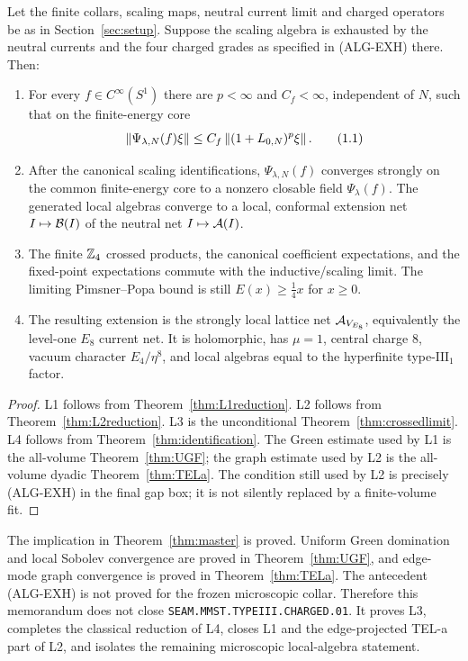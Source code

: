 \begin{theorem}
\label{thm:master}
Let the finite collars, scaling maps, neutral current limit and charged
operators be as in Section~\ref{sec:setup}.  Suppose the scaling algebra
is exhausted by the neutral currents and
the four charged grades as specified in \textup{(ALG-EXH)} there.  Then:
\begin{enumerate}[label=\textup{(L\arabic*)}]
\item For every $f\in C^\infty(S^1)$ there are $p<\infty$ and
  $C_f<\infty$, independent of $N$, such that on the finite-energy core
  \[
    \left\lVert\Psi_{\lambda,N}(f)\xi\right\rVert
    \le C_f\left\lVert(1+L_{0,N})^p\xi\right\rVert.
  \tag{1.1}\label{eq:L1}
  \]
\item After the canonical scaling identifications,
  $\Psi_{\lambda,N}(f)$ converges strongly on the common finite-energy
  core to a nonzero closable field $\Psi_\lambda(f)$.  The generated local
  algebras converge to a local, conformal extension net
  $I\mapsto\mathcal B(I)$ of the neutral net $I\mapsto\mathcal A(I)$.
\item The finite $\mathbb Z_4$ crossed products, the canonical coefficient
  expectations, and the fixed-point expectations commute with the
  inductive/scaling limit.  The limiting Pimsner--Popa bound is still
  $E(x)\ge\frac14x$ for $x\ge0$.
\item The resulting extension is the strongly local lattice net
  $\mathcal A_{V_{E_8}}$, equivalently the level-one $E_8$ current net.  It is
  holomorphic, has $\mu=1$, central charge $8$, vacuum character
  $E_4/\eta^8$, and local algebras equal to the hyperfinite
  type-$\mathrm{III}_1$ factor.
\end{enumerate}
\end{theorem}

\begin{proof}
L1 follows from Theorem~\ref{thm:L1reduction}.  L2 follows from
Theorem~\ref{thm:L2reduction}.  L3 is the unconditional
Theorem~\ref{thm:crossedlimit}.  L4 follows from
Theorem~\ref{thm:identification}.  The Green estimate used by L1 is the
all-volume Theorem~\ref{thm:UGF}; the graph estimate used by L2 is the
all-volume dyadic Theorem~\ref{thm:TELa}.  The condition still used by L2
is precisely \textup{(ALG-EXH)} in the final gap box; it is not silently
replaced by a finite-volume fit.
\end{proof}

\begin{remark}
The implication in Theorem~\ref{thm:master} is proved.  Uniform Green
domination and local Sobolev convergence are proved in
Theorem~\ref{thm:UGF}, and edge-mode graph convergence is proved in
Theorem~\ref{thm:TELa}.  The antecedent \textup{(ALG-EXH)} is not proved
for the frozen microscopic collar.  Therefore
this memorandum does not close
\texttt{SEAM.MMST.TYPEIII.CHARGED.01}.  It proves L3, completes the
classical reduction of L4, closes L1 and the edge-projected TEL-a part
of L2, and isolates the remaining microscopic local-algebra statement.
\end{remark}

